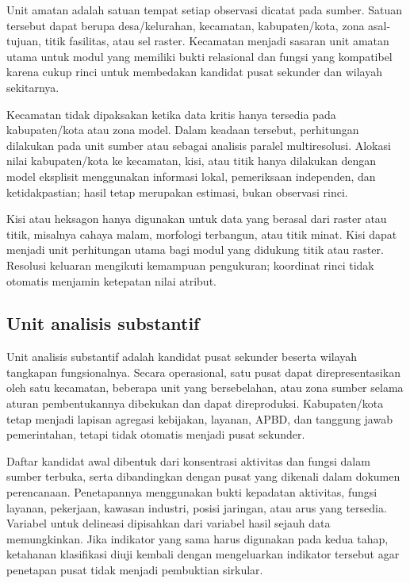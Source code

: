 \documentclass[11pt,a4paper,oneside,openany,indonesian]{report}
\begin{document}
Unit amatan adalah satuan tempat setiap observasi dicatat pada sumber.
Satuan tersebut dapat berupa desa/kelurahan, kecamatan, kabupaten/kota,
zona asal-tujuan, titik fasilitas, atau sel raster. Kecamatan menjadi
sasaran unit amatan utama untuk modul yang memiliki bukti relasional dan
fungsi yang kompatibel karena cukup rinci untuk membedakan kandidat
pusat sekunder dan wilayah sekitarnya.

Kecamatan tidak dipaksakan ketika data kritis hanya tersedia pada
kabupaten/kota atau zona model. Dalam keadaan tersebut, perhitungan
dilakukan pada unit sumber atau sebagai analisis paralel multiresolusi.
Alokasi nilai kabupaten/kota ke kecamatan, kisi, atau titik hanya
dilakukan dengan model eksplisit menggunakan informasi lokal, pemeriksaan
independen, dan ketidakpastian; hasil tetap merupakan estimasi, bukan
observasi rinci.

Kisi atau heksagon hanya digunakan untuk data yang berasal dari raster
atau titik, misalnya cahaya malam, morfologi terbangun, atau titik
minat. Kisi dapat menjadi unit perhitungan utama bagi modul yang
didukung titik atau raster. Resolusi keluaran mengikuti kemampuan
pengukuran; koordinat rinci tidak otomatis menjamin ketepatan nilai
atribut.

\subsection{Unit analisis
substantif}\label{unit-analisis-substantif}

Unit analisis substantif adalah kandidat pusat sekunder beserta wilayah
tangkapan fungsionalnya. Secara operasional, satu pusat dapat
direpresentasikan oleh satu kecamatan, beberapa unit yang bersebelahan,
atau zona sumber selama aturan pembentukannya dibekukan dan dapat
direproduksi. Kabupaten/kota tetap menjadi lapisan agregasi kebijakan,
layanan, APBD, dan tanggung jawab pemerintahan, tetapi tidak otomatis
menjadi pusat sekunder.

Daftar kandidat awal dibentuk dari konsentrasi aktivitas dan fungsi
dalam sumber terbuka, serta dibandingkan dengan pusat yang dikenali
dalam dokumen perencanaan. Penetapannya menggunakan bukti kepadatan
aktivitas, fungsi layanan, pekerjaan, kawasan industri, posisi jaringan,
atau arus yang tersedia. Variabel untuk delineasi dipisahkan dari
variabel hasil sejauh data memungkinkan. Jika indikator yang sama harus
digunakan pada kedua tahap, ketahanan klasifikasi diuji kembali dengan
mengeluarkan indikator tersebut agar penetapan pusat tidak menjadi
pembuktian sirkular.
\end{document}

